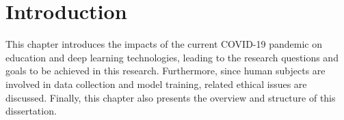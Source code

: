 \chapter{Introduction}
This chapter introduces the impacts of the current COVID-19 pandemic on education and deep learning technologies, leading to the research questions and goals to be achieved in this research. Furthermore, since human subjects are involved in data collection and model training, related ethical issues are discussed. Finally, this chapter also presents the overview and structure of this dissertation.




